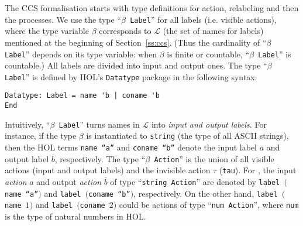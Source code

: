 \documentclass[GCNS]{yincog}
\renewcommand{\HOLinline}[1]{\mbox{\textup{\texttt{#1}}}}
\renewcommand{\HOLConst}[1]{\texttt{#1}}
\renewcommand{\HOLNumLit}[1]{\ensuremath{#1}}
\renewcommand{\HOLStringLit}[1]{\textrm{``#1''}}
\renewcommand{\HOLTyOp}[1]{\texttt{#1}}
\theoremstyle{remark}
\theoremstyle{theorem}
\theoremstyle{remark}
\begin{document}
The CCS formalisation starts with type definitions for action, relabeling
and then the processes. We use the type ``\HOLinline{\ensuremath{\beta} \HOLTyOp{Label}}''
for all labels (i.e. visible actions), where the type variable
$\beta $ corresponds to $\mathscr{L}$ (the set of names for labels) mentioned
at the beginning of Section~\ref{ss:ccs}. (Thus the cardinality of ``\HOLinline{\ensuremath{\beta} \HOLTyOp{Label}}''
depends on its type variable: when $\beta $ is finite or countable, ``\HOLinline{\ensuremath{\beta} \HOLTyOp{Label}}''
is countable.) All labels are divided into input and output ones. The type
``\HOLinline{\ensuremath{\beta} \HOLTyOp{Label}}'' is defined by HOL's
\texttt{Datatype} package in the following syntax:
%
\begin{lstlisting}
Datatype: Label = name 'b | coname 'b
End
\end{lstlisting} Intuitively, ``\HOLinline{\ensuremath{\beta} \HOLTyOp{Label}}''
turns names in $\mathscr{L}$ into \emph{input and output labels}. For instance,
if the type $\beta $ is instantiated to \texttt{string} (the type of all
ASCII strings), then the HOL terms
\HOLinline{\HOLConst{name} \HOLStringLit{a}} and
\HOLinline{\HOLConst{coname} \HOLStringLit{b}} denote the input label
$a$ and output label $\overline{b}$, respectively. The type ``\HOLinline{\ensuremath{\beta} \HOLTyOp{Action}}''
is the union of all visible actions (input and output labels) and the invisible
action $\tau $ (\texttt{tau}). For , the input \emph{action}
$a$ and output \emph{action} $\overline{b}$ of type ``\HOLinline{\HOLTyOp{string} \HOLTyOp{Action}}''
are denoted by
\HOLinline{\HOLConst{label} \ensuremath{(}\HOLConst{name} \HOLStringLit{a}\ensuremath{)}}
and
\HOLinline{\HOLConst{label} \ensuremath{(}\HOLConst{coname} \HOLStringLit{b}\ensuremath{)}},
respectively. On the other hand,
\HOLinline{\HOLConst{label} \ensuremath{(}\HOLConst{name} \HOLNumLit{1}\ensuremath{)}}
and
\HOLinline{\HOLConst{label} \ensuremath{(}\HOLConst{coname} \HOLNumLit{2}\ensuremath{)}}
could be actions of type ``\HOLinline{\HOLTyOp{num} \HOLTyOp{Action}}'',
where \HOLinline{\HOLTyOp{num}} is the type of natural numbers in HOL.
\end{document}
